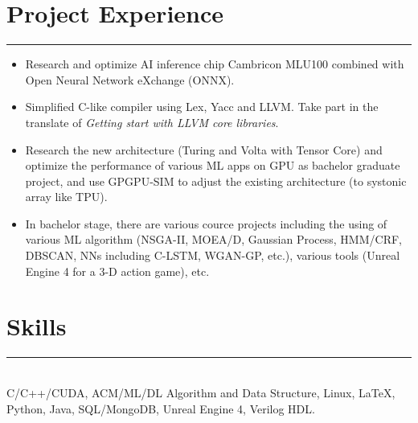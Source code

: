 \documentclass[a4paper]{article}
\begin{document}
		\section*{Project Experience}
		\rule[1pt]{18cm}{0.01em}
		\begin{itemize}
		\item Research and optimize AI inference chip Cambricon MLU100 combined with Open Neural Network eXchange (ONNX). 
		\item Simplified C-like compiler using Lex, Yacc and LLVM. Take part in the translate of \emph{Getting start with LLVM core libraries}.
		\item Research the new architecture (Turing and Volta with Tensor Core) and optimize the performance of various ML apps on GPU as bachelor graduate project, and use GPGPU-SIM to adjust the existing architecture (to systonic array like TPU). 
		\item In bachelor stage, there are various cource projects including the using of various ML algorithm (NSGA-II, MOEA/D, Gaussian Process, HMM/CRF, DBSCAN, NNs including C-LSTM, WGAN-GP, etc.), various tools (Unreal Engine 4 for a 3-D action game), etc.
		\end{itemize}
		\section*{Skills}
		\rule[1pt]{18cm}{0.01em}\\
		C/C++/CUDA, ACM/ML/DL Algorithm and Data Structure, Linux, \LaTeX, Python, Java, SQL/MongoDB, Unreal Engine 4, Verilog HDL.
		
	
\end{document}
